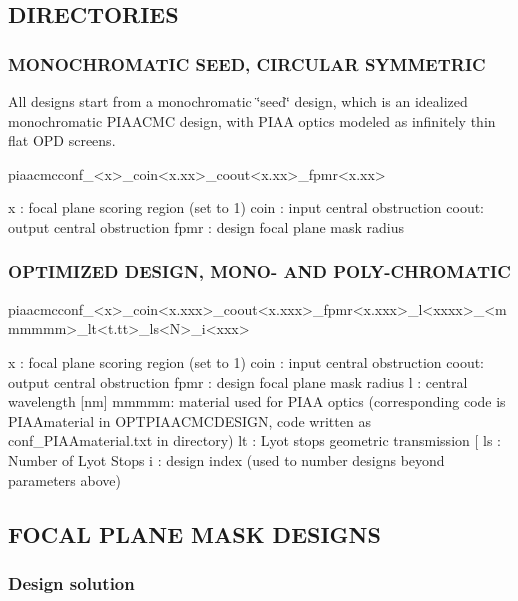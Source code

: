 \subsection*{D\+I\+R\+E\+C\+T\+O\+R\+I\+E\+S}

\subsubsection*{M\+O\+N\+O\+C\+H\+R\+O\+M\+A\+T\+I\+C S\+E\+E\+D, C\+I\+R\+C\+U\+L\+A\+R S\+Y\+M\+M\+E\+T\+R\+I\+C}

All designs start from a monochromatic \char`\"{}seed\char`\"{} design, which is an idealized monochromatic P\+I\+A\+A\+C\+M\+C design, with P\+I\+A\+A optics modeled as infinitely thin flat O\+P\+D screens.

\begin{DoxyVerb}piaacmcconf_<x>_coin<x.xx>_coout<x.xx>_fpmr<x.xx>

x    : focal plane scoring region (set to 1) 
coin : input central obstruction
coout: output central obstruction
fpmr : design focal plane mask radius
\end{DoxyVerb}


\subsubsection*{O\+P\+T\+I\+M\+I\+Z\+E\+D D\+E\+S\+I\+G\+N, M\+O\+N\+O-\/ A\+N\+D P\+O\+L\+Y-\/\+C\+H\+R\+O\+M\+A\+T\+I\+C}

\begin{DoxyVerb}piaacmcconf_<x>_coin<x.xxx>_coout<x.xxx>_fpmr<x.xxx>_l<xxxx>_<mmmmmm>_lt<t.tt>_ls<N>_i<xxx>

x    : focal plane scoring region (set to 1) 
coin : input central obstruction
coout: output central obstruction
fpmr : design focal plane mask radius
l    : central wavelength [nm]
mmmmm: material used for PIAA optics (corresponding code is PIAAmaterial in OPTPIAACMCDESIGN, code written as conf_PIAAmaterial.txt in directory)
lt   : Lyot stops geometric transmission [%
ls   : Number of Lyot Stops
i    : design index (used to number designs beyond parameters above)
\end{DoxyVerb}


\subsection*{F\+O\+C\+A\+L P\+L\+A\+N\+E M\+A\+S\+K D\+E\+S\+I\+G\+N\+S}

\subsubsection*{Design solution}


